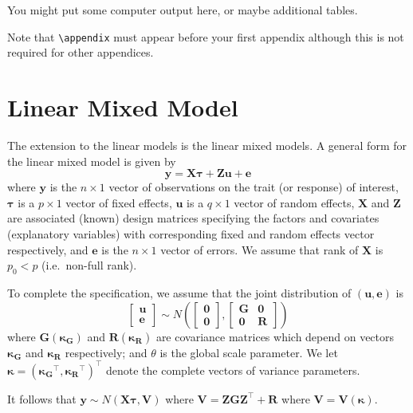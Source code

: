 \documentclass{umagthesis}
\begin{document}
You might put some computer output here, or maybe additional tables.

Note that \texttt{\textbackslash{}appendix} must appear before your first appendix although this is not required for other appendices.

\chapter{Linear Mixed Model}\label{lmm}

The extension to the linear models is the linear mixed models. A general form for the linear mixed model is given by
\begin{equation}
\boldsymbol{y} = \boldsymbol{X}\boldsymbol{\tau} + \boldsymbol{Z}\boldsymbol{u} + \boldsymbol{e} \label{eq:lmm}
\end{equation}
where \(\boldsymbol{y}\) is the \(n\times 1\) vector of observations on the trait (or response) of interest, \(\boldsymbol{\tau}\) is a \(p \times 1\) vector of fixed effects, \(\boldsymbol{u}\) is a \(q \times 1\) vector of random effects, \(\boldsymbol{X}\) and \(\boldsymbol{Z}\) are associated (known) design matrices specifying the factors and covariates (explanatory variables) with corresponding fixed and random effects vector respectively, and \(\boldsymbol{e}\) is the \(n\times 1\) vector of errors. We assume that rank of \(\boldsymbol{X}\) is \(p_0 < p\) (i.e.~non-full rank).

To complete the
specification, we assume that the joint distribution of \((\boldsymbol{u}, \boldsymbol{e})\) is
\[ \begin{bmatrix}
\boldsymbol{u} \\
\boldsymbol{e} 
\end{bmatrix}
\sim N \left( 
\begin{bmatrix}
\boldsymbol{0} \\
\boldsymbol{0} 
\end{bmatrix}, 
\begin{bmatrix}
\boldsymbol{G} & \boldsymbol{0} \\
\boldsymbol{0} & \boldsymbol{R} 
\end{bmatrix}
\right)
\]
where \(\boldsymbol{G}(\boldsymbol{\kappa_G})\) and \(\boldsymbol{R}(\boldsymbol{\kappa_R})\) are covariance matrices which depend on vectors \(\boldsymbol{\kappa_G}\) and \(\boldsymbol{\kappa_R}\) respectively; and \(\theta\) is the global scale parameter.
We let \(\boldsymbol{\kappa} = (\boldsymbol{\kappa_G}^\top, \boldsymbol{\kappa_R}^\top)^\top\) denote the complete vectors of variance parameters.

It follows that \(\boldsymbol{y} \sim N(\boldsymbol{X\tau}, \boldsymbol{V})\) where \(\boldsymbol{V} = \boldsymbol{ZGZ}^\top + \boldsymbol{R}\) where \(\boldsymbol{V}=\boldsymbol{V}(\boldsymbol{\kappa})\).

\printbibliography[heading=bibintoc]
\end{document}
